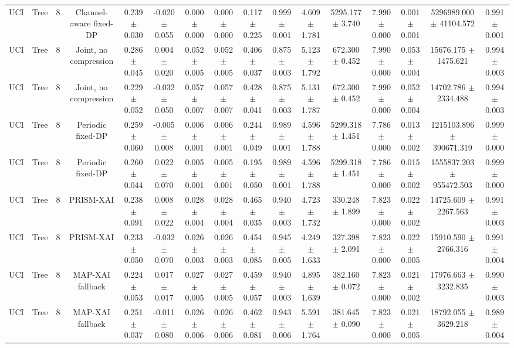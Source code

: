 \begin{tabular}{lccccccccccccccc}
UCI & Tree & 8 & Channel-aware fixed-DP & 0.239 $\pm$ 0.030 & -0.020 $\pm$ 0.055 & 0.000 $\pm$ 0.000 & 0.000 $\pm$ 0.000 & 0.117 $\pm$ 0.225 & 0.999 $\pm$ 0.001 & 4.609 $\pm$ 1.781 & 5295.177 $\pm$ 3.740 & 7.990 $\pm$ 0.000 & 0.001 $\pm$ 0.001 & 5296989.000 $\pm$ 41104.572 & 0.991 $\pm$ 0.001 \\
UCI & Tree & 8 & Joint, no compression & 0.286 $\pm$ 0.045 & 0.004 $\pm$ 0.020 & 0.052 $\pm$ 0.005 & 0.052 $\pm$ 0.005 & 0.406 $\pm$ 0.037 & 0.875 $\pm$ 0.003 & 5.123 $\pm$ 1.792 & 672.300 $\pm$ 0.452 & 7.990 $\pm$ 0.000 & 0.053 $\pm$ 0.004 & 15676.175 $\pm$ 1475.621 & 0.994 $\pm$ 0.003 \\
UCI & Tree & 8 & Joint, no compression & 0.229 $\pm$ 0.052 & -0.032 $\pm$ 0.050 & 0.057 $\pm$ 0.007 & 0.057 $\pm$ 0.007 & 0.428 $\pm$ 0.041 & 0.875 $\pm$ 0.003 & 5.131 $\pm$ 1.787 & 672.300 $\pm$ 0.452 & 7.990 $\pm$ 0.000 & 0.052 $\pm$ 0.004 & 14702.786 $\pm$ 2334.488 & 0.994 $\pm$ 0.003 \\
UCI & Tree & 8 & Periodic fixed-DP & 0.259 $\pm$ 0.060 & -0.005 $\pm$ 0.008 & 0.006 $\pm$ 0.001 & 0.006 $\pm$ 0.001 & 0.244 $\pm$ 0.049 & 0.989 $\pm$ 0.001 & 4.596 $\pm$ 1.788 & 5299.318 $\pm$ 1.451 & 7.786 $\pm$ 0.000 & 0.013 $\pm$ 0.002 & 1215103.896 $\pm$ 390671.319 & 0.999 $\pm$ 0.000 \\
UCI & Tree & 8 & Periodic fixed-DP & 0.260 $\pm$ 0.044 & 0.022 $\pm$ 0.070 & 0.005 $\pm$ 0.001 & 0.005 $\pm$ 0.001 & 0.195 $\pm$ 0.050 & 0.989 $\pm$ 0.001 & 4.596 $\pm$ 1.788 & 5299.318 $\pm$ 1.451 & 7.786 $\pm$ 0.000 & 0.015 $\pm$ 0.002 & 1555837.203 $\pm$ 955472.503 & 0.999 $\pm$ 0.000 \\
UCI & Tree & 8 & PRISM-XAI & 0.238 $\pm$ 0.091 & 0.008 $\pm$ 0.022 & 0.028 $\pm$ 0.004 & 0.028 $\pm$ 0.004 & 0.465 $\pm$ 0.035 & 0.940 $\pm$ 0.003 & 4.723 $\pm$ 1.732 & 330.248 $\pm$ 1.899 & 7.823 $\pm$ 0.000 & 0.022 $\pm$ 0.002 & 14725.609 $\pm$ 2267.563 & 0.991 $\pm$ 0.003 \\
UCI & Tree & 8 & PRISM-XAI & 0.233 $\pm$ 0.050 & -0.032 $\pm$ 0.070 & 0.026 $\pm$ 0.003 & 0.026 $\pm$ 0.003 & 0.454 $\pm$ 0.085 & 0.945 $\pm$ 0.005 & 4.249 $\pm$ 1.633 & 327.398 $\pm$ 2.091 & 7.823 $\pm$ 0.000 & 0.022 $\pm$ 0.005 & 15910.590 $\pm$ 2766.316 & 0.991 $\pm$ 0.004 \\
UCI & Tree & 8 & MAP-XAI fallback & 0.224 $\pm$ 0.053 & 0.017 $\pm$ 0.017 & 0.027 $\pm$ 0.005 & 0.027 $\pm$ 0.005 & 0.459 $\pm$ 0.057 & 0.940 $\pm$ 0.003 & 4.895 $\pm$ 1.639 & 382.160 $\pm$ 0.072 & 7.823 $\pm$ 0.000 & 0.021 $\pm$ 0.002 & 17976.663 $\pm$ 3232.835 & 0.990 $\pm$ 0.003 \\
UCI & Tree & 8 & MAP-XAI fallback & 0.251 $\pm$ 0.037 & -0.011 $\pm$ 0.080 & 0.026 $\pm$ 0.006 & 0.026 $\pm$ 0.006 & 0.462 $\pm$ 0.081 & 0.943 $\pm$ 0.006 & 5.591 $\pm$ 1.764 & 381.645 $\pm$ 0.090 & 7.823 $\pm$ 0.000 & 0.021 $\pm$ 0.005 & 18792.055 $\pm$ 3629.218 & 0.989 $\pm$ 0.004 \\
\bottomrule
\end{tabular}
